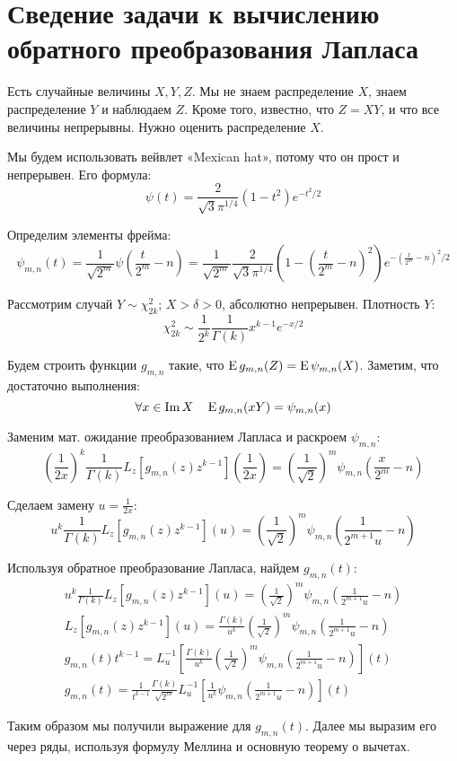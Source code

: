 \chapter {Сведение задачи к вычислению обратного преобразования Лапласа}
Есть случайные величины $X, Y, Z$. Мы не знаем распределение $X$, знаем распределение $Y$ и наблюдаем $Z$. Кроме того, известно, что $Z = XY$, и что все величины непрерывны. Нужно оценить распределение $X$.

Мы будем использовать вейвлет «Mexican hat», потому что он прост и непрерывен. Его формула:
\[
    \psi(t) = \frac{2}{\sqrt{3} \pi^{1 / 4}} (1-t^2)e^{-t^2 / 2}
\]

Определим элементы фрейма: \\
\[
    \psi_{m,n}(t) = 
    \frac{1}{\sqrt{2^m}} \psi\left( \frac{t}{2^m}-n \right) =
    \frac{1}{\sqrt{2^m} }\frac{2}{\sqrt{3} \pi^{1 / 4}} \left(1-\left( \frac{t}{2^m} - n \right)^2 \right) e^{-\left( \frac{t}{2^m} - n \right)^2 / 2}
\]

Рассмотрим случай $Y \sim \chi^2_{2k}$; $X > \delta > 0$, абсолютно непрерывен. Плотность $Y$:
\[
    \chi^2_{2k} \sim \frac{1}{2^k} \frac{1}{\Gamma(k)} x^{k-1} e^{-x / 2}
\]


Будем строить функции $g_{m,n}$ такие, что $\operatorname{E} g_{m,n}(Z) = \operatorname{E} \psi_{m,n}(X)$. Заметим, что достаточно выполнения:
\[
    \forall x \in \operatorname{Im} X \quad \operatorname{E} g_{m,n} (xY) = \psi_{m,n}(x) 
\]

Заменим мат. ожидание преобразованием Лапласа и раскроем $\psi_{m,n}$:
\[
    \left( \frac{1}{2x} \right)^k \frac{1}{\Gamma(k)} L_z \left[g_{m,n}(z) z^{k-1}\right] \left( \frac{1}{2x} \right) = 
    \left( \frac{1}{\sqrt{2} } \right)^m \psi_{m,n} \left( \frac{x}{2^m} - n \right) 
\]

Сделаем замену $u = \frac{1}{2x}$:
\[
    u^k \frac{1}{\Gamma(k)} L_z \left[g_{m,n}(z) z^{k-1}\right] \left( u \right) = 
    \left( \frac{1}{\sqrt{2} } \right)^m \psi_{m,n} \left( \frac{1}{2^{m+1} u} - n \right) 
\]

Используя обратное преобразование Лапласа, найдем $g_{m,n}(t)$:
\begin{gather*}
    u^k \frac{1}{\Gamma(k)} L_z \left[g_{m,n}(z) z^{k-1}\right] \left( u \right) = 
    \left( \frac{1}{\sqrt{2} } \right)^m \psi_{m,n} \left( \frac{1}{2^{m+1} u} - n \right)
\\
    L_z \left[g_{m,n}(z) z^{k-1}\right] \left( u \right) = 
    \frac{\Gamma(k)}{u^k} \left( \frac{1}{\sqrt{2} } \right)^m \psi_{m,n} \left( \frac{1}{2^{m+1} u} - n \right)
\\
    g_{m,n}(t) t^{k-1} = 
    L^{-1}_u \left[ \frac{\Gamma(k)}{u^k} \left( \frac{1}{\sqrt{2} } \right)^m \psi_{m,n} \left( \frac{1}{2^{m+1} u} - n \right) \right] (t)
\\
    g_{m,n}(t) = 
    \frac{1}{t^{k-1}} \frac{\Gamma(k)}{\sqrt{2^m}} L^{-1}_u \left[ \frac{1}{u^k} \psi_{m,n} \left( \frac{1}{2^{m+1} u} - n \right) \right] (t)
\end{gather*}

Таким образом мы получили выражение для $g_{m,n}(t)$. Далее мы выразим его через ряды, используя формулу Меллина и основную теорему о вычетах.
